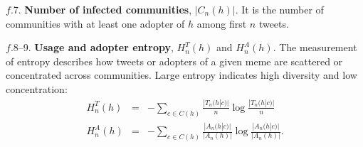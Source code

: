 \documentclass[letterpaper]{article}
\begin{document}
\noindent $f$.7. \textbf{Number of infected communities}, $|C_n(h)|$.  It is the number of communities with at least one adopter of $h$ among first $n$ tweets.










\noindent $f$.8--9. \textbf{Usage and adopter entropy}, $H_n^T(h)$ and $H_n^A(h)$.
The measurement of entropy describes how  tweets or adopters of a
given meme are scattered or concentrated across communities. Large entropy indicates high
diversity and low concentration:
%
\begin{eqnarray*}
%
H_n^T(h) & = & -\sum_{c \in C(h)} \frac{|T_n(h|c)|}{n} \log
\frac{|T_n(h|c)|}{n} \\
%
H_n^A(h) & = & -\sum_{c \in C(h)} \frac{|A_n(h|c)|}{|A_n(h)|} \log
\frac{|A_n(h|c)|}{|A_n(h)|}.
%
\end{eqnarray*}
\end{document}
